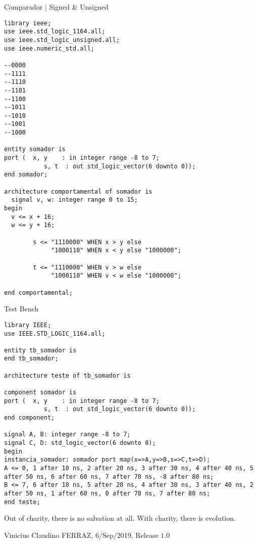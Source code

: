 \documentclass[12pt]{article}
\begin{document}
\Large

\begin{center}
Comparador | Signed \& Unsigned
\end{center}

\normalsize

\begin{verbatim}
library ieee;
use ieee.std_logic_1164.all;
use ieee.std_logic_unsigned.all;
use ieee.numeric_std.all;

--0000
--1111
--1110
--1101
--1100
--1011
--1010
--1001
--1000

entity somador is
port (	x, y 	: in integer range -8 to 7;
		   s, t  : out std_logic_vector(6 downto 0));
end somador;

architecture comportamental of somador is
  signal v, w: integer range 0 to 15;
begin
  v <= x + 16;
  w <= y + 16;

		s <= "1110000" WHEN x > y else
		     "1000110" WHEN x < y else "1000000";

		t <= "1110000" WHEN v > w else
		     "1000110" WHEN v < w else "1000000";

end comportamental;
\end{verbatim}

\vspace{10mm}

\Large

\begin{center}
Test Bench
\end{center}

\normalsize

\begin{verbatim}
library IEEE;
use IEEE.STD_LOGIC_1164.all;

entity tb_somador is
end tb_somador;

architecture teste of tb_somador is

component somador is
port (	x, y 	: in integer range -8 to 7;
		   s, t  : out std_logic_vector(6 downto 0));
end component;

signal A, B: integer range -8 to 7;
signal C, D: std_logic_vector(6 downto 0);
begin
instancia_somador: somador port map(x=>A,y=>B,s=>C,t=>D);
A <= 0, 1 after 10 ns, 2 after 20 ns, 3 after 30 ns, 4 after 40 ns, 5 after 50 ns, 6 after 60 ns, 7 after 70 ns, -8 after 80 ns;
B <= 7, 6 after 10 ns, 5 after 20 ns, 4 after 30 ns, 3 after 40 ns, 2 after 50 ns, 1 after 60 ns, 0 after 70 ns, 7 after 80 ns;
end teste;
\end{verbatim}


\vspace{3mm}

Out of charity, there is no salvation at all. With charity, there is evolution.

\vspace{3mm}

Vinicius Claudino FERRAZ, 6/Sep/2019, Release $1.0$
\end{document}
